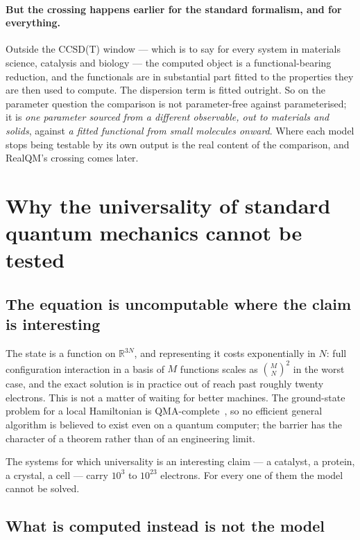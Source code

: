 \documentclass[11pt]{article}
\begin{document}
\paragraph{But the crossing happens earlier for the standard formalism, and for everything.}
Outside the CCSD(T) window --- which is to say for every system in materials science, catalysis
and biology --- the computed object is a functional-bearing reduction, and the functionals are
in substantial part fitted to the properties they are then used to compute. The dispersion term is
fitted outright. So on the parameter question the comparison is not parameter-free against
parameterised; it is \emph{one parameter sourced from a different observable, out to materials
and solids}, against \emph{a fitted functional from small molecules onward}. Where each model
stops being testable by its own output is the real content of the comparison, and RealQM's
crossing comes later.

\section{Why the universality of standard quantum mechanics cannot be tested}\label{sec:cannot}

\subsection{The equation is uncomputable where the claim is interesting}

The state is a function on $\mathbb{R}^{3N}$, and representing it costs exponentially in $N$:
full configuration interaction in a basis of $M$ functions scales as $\binom{M}{N}^2$ in the worst
case, and the exact solution is in practice out of reach past roughly twenty electrons. This is
not a matter of waiting for better machines. The ground-state problem for a local Hamiltonian is
QMA-complete~\cite{KempeKitaevRegev2006,KitaevShenVyalyi2002}, so no efficient general algorithm
is believed to exist even on a quantum computer;
the barrier has the character of a theorem rather than of an engineering limit.

The systems for which universality is an interesting claim --- a catalyst, a protein, a crystal,
a cell --- carry $10^3$ to $10^{23}$ electrons. For every one of them the model cannot be solved.

\subsection{What is computed instead is not the model}
\end{document}

